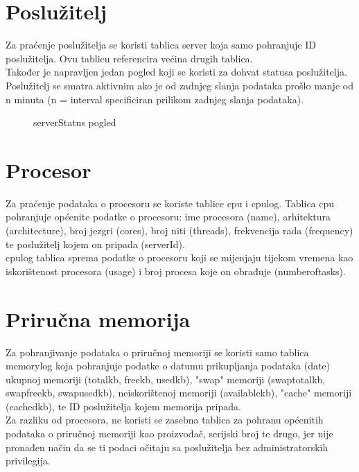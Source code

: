 \documentclass[zavrsnirad]{fer}
\begin{document}
\section{Poslužitelj}
Za praćenje poslužitelja se koristi tablica server koja samo pohranjuje ID poslužitelja. Ovu tablicu referencira većina drugih tablica.
\\Također je napravljen jedan pogled koji se koristi za dohvat statusa poslužitelja. Poslužitelj se smatra aktivnim ako je od zadnjeg slanja podataka prošlo manje od n minuta (n = interval specificiran prilikom zadnjeg slanja podataka).

\begin{figure}[htb]
	\centering
	
	\caption{serverStatus pogled}
\end{figure}
\FloatBarrier

\section{Procesor}
Za praćenje podataka o procesoru se koriste tablice cpu i cpulog. Tablica cpu pohranjuje općenite podatke o procesoru: ime procesora (name), arhitektura (architecture), broj jezgri (cores), broj niti (threads), frekvencija rada (frequency) te poslužitelj kojem on pripada (serverId).
\\cpulog tablica sprema podatke o procesoru koji se mijenjaju tijekom vremena kao iskorištenost procesora (usage) i broj procesa koje on obrađuje (numberoftasks).

\section{Priručna memorija}
Za pohranjivanje podataka o priručnoj memoriji se koristi samo tablica memorylog koja pohranjuje podatke o datumu prikupljanja podataka (date) ukupnoj memoriji (totalkb, freekb, usedkb), "swap" memoriji (swaptotalkb, swapfreekb, swapusedkb), neiskorištenoj memoriji (availablekb), "cache" memoriji (cachedkb), te ID poslužitelja kojem memorija pripada.
\\Za razliku od procesora, ne koristi se zasebna tablica za pohranu općenitih podataka o priručnoj memoriji kao proizvođač, serijski broj te drugo, jer nije pronađen način da se ti podaci očitaju sa poslužitelja bez administratorskih privilegija.
\end{document}
